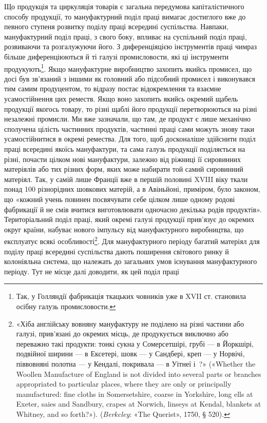 Що продукція та циркуляція товарів є загальна передумова
капіталістичного способу продукції, то мануфактурний поділ
праці вимагає достиглого вже до певного ступеня розвитку поділу
праці всередині суспільства. Навпаки, мануфактурний поділ
праці, з свого боку, впливає на суспільний поділ праці, розвиваючи
та розгалужуючи його. З диференціяцією інструментів
праці чимраз більше диференціюються й ті галузі промисловости,
які ці інструменти продукують\footnote{
Так, у Голляндії фабрикація ткацьких човників уже в XVII ст.
становила осібну галузь промисловости.
}. Якщо мануфактурне виробництво
захопить якийсь промисел, що досі був зв’язаний з іншими
як головний або підсобний промисел і виконувався тим самим
продуцентом, то відразу постає відокремлення та взаємне усамостійнення
цих реместв. Якщо воно захопить якийсь окремий
щабель продукції якогось товару, то різні щаблі його продукції
перетворюються на різні незалежні промисли. Ми вже зазначали,
що там, де продукт є лише механічно сполучена цілість частинних
продуктів, частинні праці сами можуть знову таки усамостійнитися
в окремі ремества. Для того, щоб досконаліше здійснити
поділ праці всередині якоїсь мануфактури, та сама галузь
продукції поділяється на різні, почасти цілком нові мануфактури,
залежно від ріжниці її сировинних матеріялів або тих різних
форм, яких може набирати той самий сировинний матеріял.
Так, у самій лише Франції вже в першій половині XVIII віку
ткали понад 100 різнорідних шовкових матерій, а в Авіньйоні,
приміром, було законом, що «кожний учень повинен посвячувати
себе цілком лише одному родові фабрикації й не смів вчитися
виготовлювати одночасно декілька родів продуктів». Територіальний
поділ праці, який окремі галузі продукції прив’язує
до окремих округ країни, набуває нового імпульсу від мануфактурного
виробництва, що експлуатує всякі особливості\footnote{
«Хіба англійську вовняну мануфактуру не поділено на різні
частини або галузі, прив’язані до окремих місць, де продукується виключно
або переважно такі продукти: тонкі сукна у Сомерсетшірі, грубі —
в Йоркшірі, подвійної ширини — в Ексетері, шовк — у Сандбері, креп —
у Норвічі, піввовняні полотна — у Кендалі, покривала — в Уітнеї і~?» («Whether the Woollen Manufacture of England is not divided
into several parts or branches appropriated to particular places, where
they are only or principally manufactured: fine cloths in Somersetshire,
coarse in Yorkshire, long ells at Exeter, saies and Sandbury, crapes at
Norwich, linseys at Kendal, blankets at Whitney, and so forth?»).
(\emph{Berkcley}: «The Querist», 1750, § 520).
}. Для мануфактурного
періоду багатий матеріял для поділу праці всередині
суспільства дають поширення світового ринку й колоніяльна
система, що належать до загальних умов існування мануфактурного
періоду. Тут не місце далі доводити, як цей поділ праці
\parbreak{}  %
